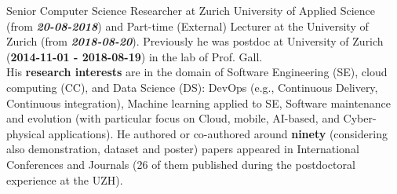 \documentclass[11pt]{article}
\begin{document}
Senior Computer Science Researcher at Zurich University of Applied Science (from \textit{\textbf{20-08-2018}}) and Part-time (External) Lecturer at the University of Zurich (from \textit{\textbf{2018-08-20}}). Previously he was postdoc at University of Zurich (\textbf{2014-11-01 - 2018-08-19}) in the lab of Prof. Gall. 
\medskip\\
His  \textbf{research interests} are in the domain of Software Engineering (SE), cloud computing (CC), and Data Science (DS): DevOps (e.g., Continuous Delivery, Continuous integration), Machine learning applied to SE, Software maintenance and evolution (with particular focus on Cloud, mobile, AI-based, and Cyber-physical applications). 
He authored or co-authored around \textbf{ninety} (considering also demonstration, dataset 
  and poster) papers appeared in International Conferences and Journals (26 of them published during the postdoctoral experience at the UZH). 
\end{document}
